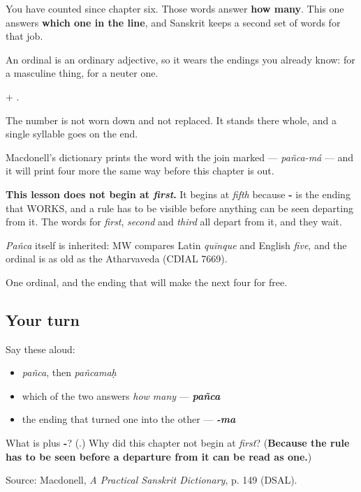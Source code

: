 You have counted \textbf{    } since chapter six. Those words answer \textbf{how many}. This one answers \textbf{which one in the line}, and Sanskrit keeps a second set of words for that job.

An ordinal is an ordinary adjective, so it wears the endings you already know: \textbf{} for a masculine thing, \textbf{} for a neuter one.

\begin{cousinweb}
\textbf{} + \textbf{}.

The number is not worn down and not replaced. It stands there whole, and a single syllable goes on the end.

Macdonell's dictionary prints the word with the join marked — \emph{pañca-má} — and it will print four more the same way before this chapter is out.

\textbf{This lesson does not begin at \emph{first}.} It begins at \emph{fifth} because \textbf{-} is the ending that WORKS, and a rule has to be visible before anything can be seen departing from it. The words for \emph{first}, \emph{second} and \emph{third} all depart from it, and they wait.

\emph{Pañca} itself is inherited: MW compares Latin \emph{quīnque} and English \emph{five}, and the ordinal is as old as the Atharvaveda (CDIAL 7669).
\end{cousinweb}

\begin{grammarlens}[title={What you've built}]
One ordinal, and the ending that will make the next four for free.
\end{grammarlens}

\subsection*{Your turn}
Say these aloud:

\begin{itemize}
\raggedright
  \item \emph{pañca}, then \emph{pañcamaḥ}
  \item which of the two answers \emph{how many} — \emph{\textbf{pañca}}
  \item the ending that turned one into the other — \emph{\textbf{-ma}}
\end{itemize}

\begin{tcolorbox}[breakable,colback=teal!4,colframe=teal!35!black,title={Before you move on}]
What is \textbf{} plus \textbf{-}? (\textbf{}.) Why did this chapter not begin at \emph{first}? (\textbf{Because the rule has to be seen before a departure from it can be read as one.})

Source: Macdonell, \emph{A Practical Sanskrit Dictionary}, p. 149 (DSAL).
\end{tcolorbox}
